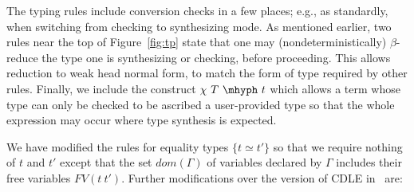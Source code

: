 \documentclass{article}
\begin{document}
The typing rules include conversion checks in a few places; e.g., as
standardly, when switching from checking to synthesizing mode.  As mentioned
earlier, two rules near the top of Figure~\ref{fig:tp} state that one may
(nondeterministically) $\beta$-reduce the type one is synthesizing or checking,
before proceeding.
This allows reduction to weak head normal form, to match the form of type
required by other rules.
Finally, we include the construct $\chi\ T\ \mhyph\ t$ which allows a term whose
type can only be checked to be ascribed a user-provided type so that the whole
expression may occur where type synthesis is expected.

We have modified the rules for equality types $\{ t \simeq t' \}$ so that we require
nothing of $t$ and $t'$ except that the set $\textit{dom}(\Gamma)$ of variables
declared by $\Gamma$ includes their free variables $\textit{FV}(t\ t')$.  Further modifications
over the version of CDLE in~\cite{stump18} are:
\end{document}
